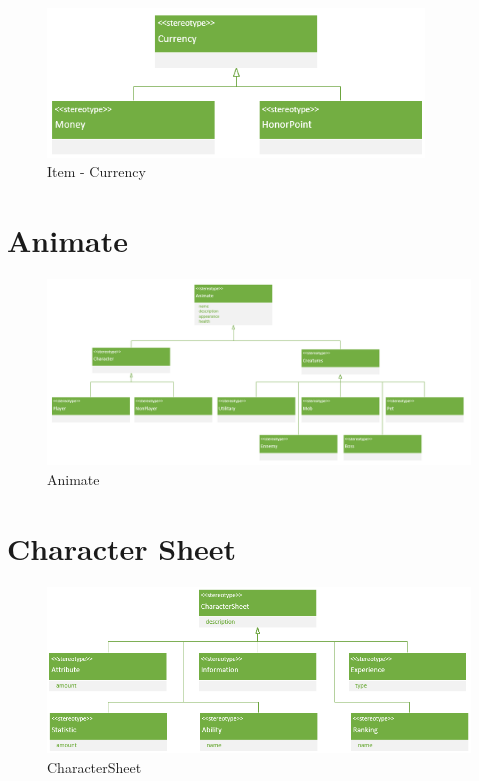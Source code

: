 \begin{figure}[H]
    \begin{center}
    \includegraphics[width=10cm]{10_img/Z_annexeA/item_currency.PNG}
    \caption{Item - Currency}
    \label{A-Currency}
    \end{center}
\end{figure}


\section{Animate}
\begin{figure}[H]
    \begin{center}
    \includegraphics[width=\linewidth]{10_img/Z_annexeA/animate.PNG}
    \caption{Animate}
    \label{A-Animate}
    \end{center}
\end{figure}



\section{Character Sheet}
\begin{figure}[H]
    \begin{center}
    \includegraphics[width=\linewidth]{10_img/Z_annexeA/cs_racine.PNG}
    \caption{CharacterSheet}
    \label{A-CS}
    \end{center}
\end{figure}

